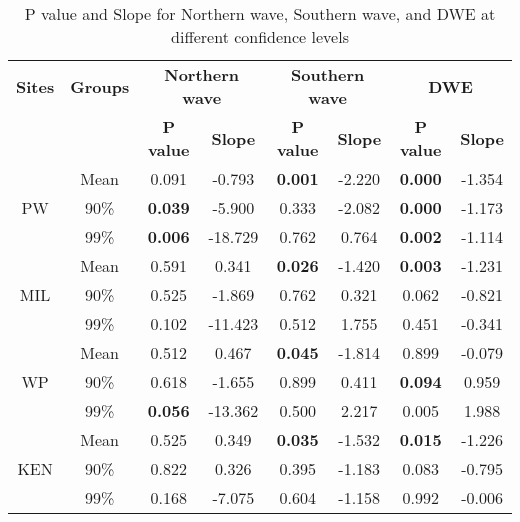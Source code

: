 \begin{table}[htbp]
\centering
\caption{P value and Slope for Northern wave, Southern wave, and DWE at different confidence levels}
\begin{tabular}{|c|c|cc|cc|cc|}
\hline
\textbf{Sites} &  \textbf{Groups}     & \multicolumn{2}{c|}{\textbf{Northern wave}} & \multicolumn{2}{c|}{\textbf{Southern wave}} & \multicolumn{2}{c|}{\textbf{DWE}} \\
\cline{3-8}
               &       & \textbf{P value} & \textbf{Slope} & \textbf{P value} & \textbf{Slope} & \textbf{P value} & \textbf{Slope} \\
\hline
\multirow{3}{*}{PW}  & Mean & 0.091 & -0.793 & \textbf{0.001} & -2.220 & \textbf{0.000} & -1.354 \\
                     & 90\% & \textbf{0.039} & -5.900 & 0.333 & -2.082 & \textbf{0.000} & -1.173 \\
                     & 99\% & \textbf{0.006} & -18.729 & 0.762 & 0.764 & \textbf{0.002} & -1.114 \\
\hline
\multirow{3}{*}{MIL} & Mean & 0.591 & 0.341 & \textbf{0.026} & -1.420 & \textbf{0.003} & -1.231 \\
                     & 90\% & 0.525 & -1.869 & 0.762 & 0.321 & 0.062 & -0.821 \\
                     & 99\% & 0.102 & -11.423 & 0.512 & 1.755 & 0.451 & -0.341 \\
\hline
\multirow{3}{*}{WP}  & Mean & 0.512 & 0.467 & \textbf{0.045} & -1.814 & 0.899 & -0.079 \\
                     & 90\% & 0.618 & -1.655 & 0.899 & 0.411 & \textbf{0.094} & 0.959 \\
                     & 99\% & \textbf{0.056} & -13.362 & 0.500 & 2.217 & 0.005 & 1.988 \\
\hline
\multirow{3}{*}{KEN} & Mean & 0.525 & 0.349 & \textbf{0.035} & -1.532 & \textbf{0.015} & -1.226 \\
                     & 90\% & 0.822 & 0.326 & 0.395 & -1.183 & 0.083 & -0.795 \\
                     & 99\% & 0.168 & -7.075 & 0.604 & -1.158 & 0.992 & -0.006 \\
\hline
\end{tabular}
\label{tab:tab3.1}
\end{table}